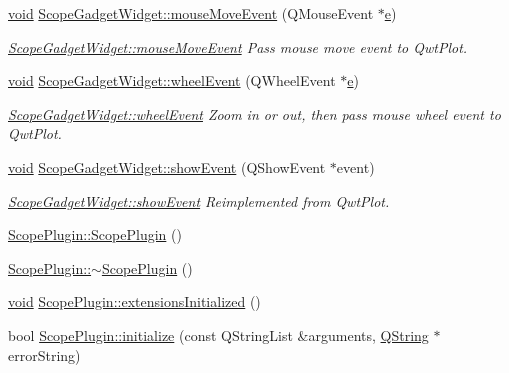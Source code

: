 \begin{DoxyCompactItemize}
\hyperlink{group___u_a_v_objects_plugin_ga444cf2ff3f0ecbe028adce838d373f5c}{void} \hyperlink{group___scope_plugin_ga3a4b3097cd04ab00ad3bbdd290186696}{\-Scope\-Gadget\-Widget\-::mouse\-Move\-Event} (\-Q\-Mouse\-Event $\ast$\hyperlink{_o_p_plots_8m_a9425be9aab51621e317ba7ade564b570}{e})
\begin{DoxyCompactList}\small\item\em \hyperlink{group___scope_plugin_ga3a4b3097cd04ab00ad3bbdd290186696}{\-Scope\-Gadget\-Widget\-::mouse\-Move\-Event} \-Pass mouse move event to \-Qwt\-Plot. \end{DoxyCompactList}\item 
\hyperlink{group___u_a_v_objects_plugin_ga444cf2ff3f0ecbe028adce838d373f5c}{void} \hyperlink{group___scope_plugin_ga1cf4485edf803c91fec9d29e6f33dfd8}{\-Scope\-Gadget\-Widget\-::wheel\-Event} (\-Q\-Wheel\-Event $\ast$\hyperlink{_o_p_plots_8m_a9425be9aab51621e317ba7ade564b570}{e})
\begin{DoxyCompactList}\small\item\em \hyperlink{group___scope_plugin_ga1cf4485edf803c91fec9d29e6f33dfd8}{\-Scope\-Gadget\-Widget\-::wheel\-Event} \-Zoom in or out, then pass mouse wheel event to \-Qwt\-Plot. \end{DoxyCompactList}\item 
\hyperlink{group___u_a_v_objects_plugin_ga444cf2ff3f0ecbe028adce838d373f5c}{void} \hyperlink{group___scope_plugin_ga323510a973ec27e6c976ec2748cfcaa6}{\-Scope\-Gadget\-Widget\-::show\-Event} (\-Q\-Show\-Event $\ast$event)
\begin{DoxyCompactList}\small\item\em \hyperlink{group___scope_plugin_ga323510a973ec27e6c976ec2748cfcaa6}{\-Scope\-Gadget\-Widget\-::show\-Event} \-Reimplemented from \-Qwt\-Plot. \end{DoxyCompactList}\item 
\hyperlink{group___scope_plugin_ga199bf070e8b30f153774fed25c1bfb85}{\-Scope\-Plugin\-::\-Scope\-Plugin} ()
\item 
\hyperlink{group___scope_plugin_ga8c6b2fb4f5b848c5462148b93158ae5e}{\-Scope\-Plugin\-::$\sim$\-Scope\-Plugin} ()
\item 
\hyperlink{group___u_a_v_objects_plugin_ga444cf2ff3f0ecbe028adce838d373f5c}{void} \hyperlink{group___scope_plugin_ga92b5617116c8cbaa97c2f26bb2863ab3}{\-Scope\-Plugin\-::extensions\-Initialized} ()
\item 
bool \hyperlink{group___scope_plugin_gad49bcc2c25eda45814189ba82b8a1a5b}{\-Scope\-Plugin\-::initialize} (const \-Q\-String\-List \&arguments, \hyperlink{group___u_a_v_objects_plugin_gab9d252f49c333c94a72f97ce3105a32d}{\-Q\-String} $\ast$error\-String)

\end{DoxyCompactItemize}
